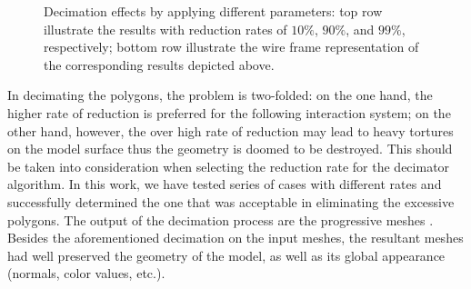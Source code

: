 \begin{figure}[t]
{\label{fig:Decimate90-w}}
\hfil
{}
\caption{Decimation effects by applying different parameters: top row illustrate the results with reduction rates of $10\%$, $90\%$, and $99\%$, respectively; bottom row illustrate the wire frame representation of the corresponding results depicted above.}%
\label{fig:Decimate}
\end{figure}

In decimating the polygons, the problem is two-folded: on the one hand, the higher rate of reduction is preferred for the following interaction system; on the other hand, however, the over high rate of reduction may lead to heavy tortures on the model surface thus the geometry is doomed to be destroyed. %
This should be taken into consideration when selecting the reduction rate for the decimator algorithm.
In this work, we have tested series of cases with different rates and successfully determined the one that was acceptable in eliminating the excessive polygons.
The output of the decimation process are the progressive meshes \cite{Hoppe1996}.
Besides the aforementioned decimation on the input meshes, the resultant meshes had well preserved the geometry of the model, as well as its global appearance (normals, color values, etc.). %
